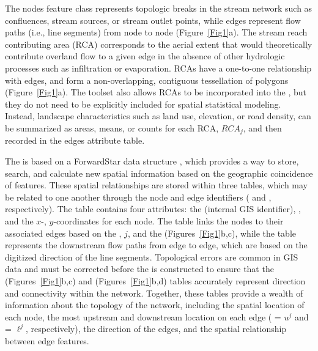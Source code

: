 \documentclass[article]{jss}
\begin{document}
The nodes feature class represents topologic breaks in the stream network such as confluences, stream sources, or stream outlet points, while edges represent flow paths (i.e., line segments) from node to node (Figure~\ref{Fig1}a). The stream reach contributing area (RCA) corresponds to the aerial extent that would theoretically contribute overland flow to a given edge in the absence of other hydrologic processes such as infiltration or evaporation. RCAs have a one-to-one relationship with edges, and form a non-overlapping, contiguous tessellation of polygons (Figure~\ref{Fig1}a). The  toolset also allows RCAs to be incorporated into the , but they do not need to be explicitly included for spatial statistical modeling. Instead, landscape characteristics such as land use, elevation, or road density, can be summarized as areas, means, or counts for each RCA, $RCA_j$, and then recorded in the edges attribute table.

The  is based on a ForwardStar data structure \citep{Ahuj:Magn:Orli:netw:1993}, which provides a way to store, search, and calculate new spatial information based on the geographic coincidence of features. These spatial relationships are stored within three tables, which may be related to one another through the node and edge identifiers ( and , respectively). The  table contains four attributes: the  (internal GIS identifier), , and the $x$-, $y$-coordinates for each node. The  table links the nodes to their associated edges based on the , $j$, and the  (Figures~\ref{Fig1}b,c), while the  table represents the downstream flow paths from edge to edge, which are based on the digitized direction of the line segments. Topological errors are common in GIS data and must be corrected before the  is constructed to ensure that the  (Figures~\ref{Fig1}b,c) and  (Figures~\ref{Fig1}b,d) tables accurately represent direction and connectivity within the network. Together, these tables provide a wealth of information about the topology of the network, including the spatial location of each node, the most upstream and downstream location on each edge ( = $u^j$ and  = $\ell^j$, respectively), the direction of the edges, and the spatial relationship between edge features.
\end{document}
